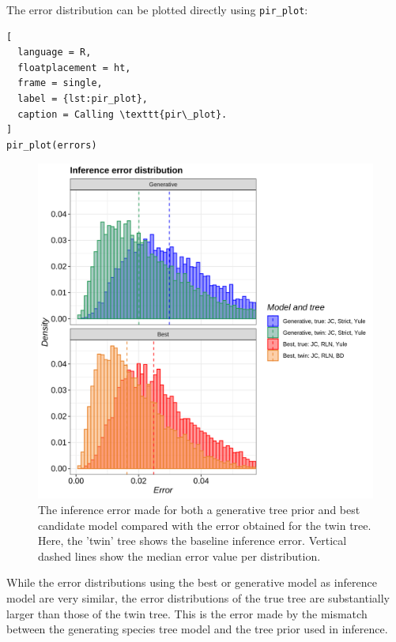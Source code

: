 The error distribution can be plotted directly using \verb;pir_plot;:

\begin{lstlisting}[
  language = R,
  floatplacement = ht,
  frame = single,
  label = {lst:pir_plot},
  caption = Calling \texttt{pir\_plot}.
]
pir_plot(errors)
\end{lstlisting}

\begin{figure}[H]
  \includegraphics[width=\textwidth]{pirouette_example_30/example_30_314/errors.png}
  \caption{
    The inference error made 
    for both a generative tree prior and best candidate model
    compared with the error obtained for the twin tree.
    Here, the 'twin' tree shows the baseline inference error.
    Vertical dashed lines show the median error value per distribution.
  }
  \label{fig:example_30}
\end{figure}

While the error distributions using the best or generative model 
as inference model are very similar, 
the error distributions of the true tree are substantially 
larger than those of the twin tree. 
This is the error made by the mismatch
between the generating species tree model and the tree prior used in inference.

